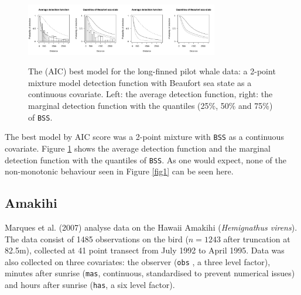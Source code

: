 \documentclass[useAMS,referee]{biom}
\begin{document}
\begin{figure}
\centering
\includegraphics[width=0.375\textwidth, trim= 0 0 3.8in 0, clip=true]{analyses/danpike-bssc.pdf}\includegraphics[width=0.375\textwidth, trim= 3.8in 0 0 0, clip=true]{analyses/danpike-bssc-hh.pdf}
\caption{The (AIC) best model for the long-finned pilot whale data: a 2-point mixture model detection function with Beaufort sea state as a continuous covariate. Left: the average detection function, right: the marginal detection function with the quantiles (25\%, 50\% and 75\%) of \texttt{BSS}.}
\label{danpike-detfct}
\end{figure}

The best model by AIC score was a 2-point mixture with \texttt{BSS} as a continuous covariate. Figure \ref{danpike-detfct} shows the average detection function and the marginal detection function with the quantiles of \texttt{BSS}. As one would expect, none of the non-monotonic behaviour seen in Figure \ref{fig1} can be seen here.

\subsection{Amakihi}
Marques et al. (2007) analyse data on the Hawaii Amakihi (\textit{Hemignathus virens}). The data consist of 1485 observations on the bird ($n=1243$ after truncation at 82.5m), collected at 41 point transect from July 1992 to April 1995. Data was also collected on three covariates: the observer (\texttt{obs} , a three level factor), minutes after sunrise (\texttt{mas}, continuous, standardised to prevent numerical issues) and hours after sunrise (\texttt{has}, a six level factor).
\end{document}
